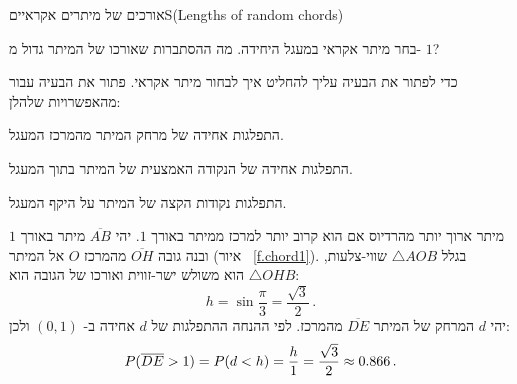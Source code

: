 \begin{prob}{אורכים של מיתרים אקראיים}{S}{(Lengths of random chords)}

בחר מיתר אקראי במעגל היחידה. מה ההסתברות שאורכו של המיתר גדול מ-%
$1$?

כדי לפתור את הבעיה עליך להחליט איך לבחור מיתר אקראי. פתור את הבעיה עבור מהאפשרויות שלהלן:

התפלגות אחידה של מרחק המיתר מהמרכז המעגל.

התפלגות אחידה של הנקודה האמצעית של המיתר בתוך המעגל.

התפלגות נקודות הקצה של המיתר על היקף המעגל.
\end{prob}

\solution{}

מיתר ארוך יותר מהרדיוס אם הוא קרוב יותר למרכז ממיתר באורך 
$1$.
יהי 
$\overline{AB}$
מיתר באורך 
$1$
ובנה
גובה
$\overline{OH}$
מהמרכז 
$O$
אל המיתר (איור%
~\ref{f.chord1}). 
בגלל 
$\triangle AOB$
שווי-צלעות,
$\triangle OHB$ 
הוא משולש ישר-זווית ואורכו של הגובה הוא:
\[
h = \sin \frac{\pi}{3} = \frac{\sqrt{3}}{2}\,.
\]
יהי
$d$
המרחק של המיתר 
$\overline{DE}$
מהמרכז. לפי ההנחה ההתפלגות של
$d$
אחידה ב-%
$(0,1)$
ולכן:
\[
P(\overline{DE}>1)=P(d<h)=\displaystyle\frac{h}{1}=\frac{\sqrt{3}}{2} \approx 0.866\,.
\]

